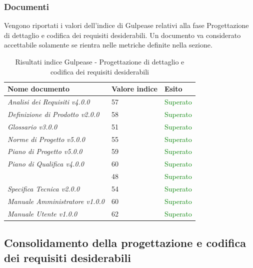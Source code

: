 	 	\subsubsection{Documenti}	 	
	 	Vengono riportati i valori dell'indice di Gulpease relativi alla fase Progettazione di dettaglio e codifica dei requisiti desiderabili. Un documento va considerato accettabile solamente se rientra nelle metriche definite nella sezione.
		\begin{table}[!ht]
			\begin{center}
				\begin{tabularx}{0.9\textwidth}{|l|l|X|}
					\hline
					\textbf{Nome documento} & \textbf{Valore indice} & \textbf{Esito}\\
					\hline						
					\emph{Analisi dei Requisiti v4.0.0} & 57 & \textcolor{green}{Superato}\\
					\hline
					\emph{Definizione di Prodotto v2.0.0} & 58 & \textcolor{green}{Superato}\\
					\hline
					\emph{Glossario v3.0.0} & 51 & \textcolor{green}{Superato}\\
					\hline					
					\emph{Norme di Progetto v5.0.0} & 55 & \textcolor{green}{Superato}\\
					\hline					
					\emph{Piano di Progetto v5.0.0} & 59 & \textcolor{green}{Superato}\\
					\hline					
					\emph{Piano di Qualifica v4.0.0} & 60 & \textcolor{green}{Superato}\\
					\hline					
					\docNameVersionSdF & 48 & \textcolor{green}{Superato}\\
					\hline	
					\emph{Specifica Tecnica v2.0.0} & 54 & \textcolor{green}{Superato}\\
					\hline
					\emph{Manuale Amministratore v1.0.0} & 60 & \textcolor{green}{Superato}\\
					\hline
					\emph{Manuale Utente v1.0.0} & 62 & \textcolor{green}{Superato}\\			
					\hline
				\end{tabularx}
			\end{center}
			\caption{Risultati indice Gulpease - Progettazione di dettaglio e codifica dei requisiti desiderabili}
		\end{table}

	\subsection{Consolidamento della progettazione e codifica dei requisiti desiderabili}
	\label{sub:consolidamento_della_progettazione_e_codifica_dei_requisiti_desiderabili}
